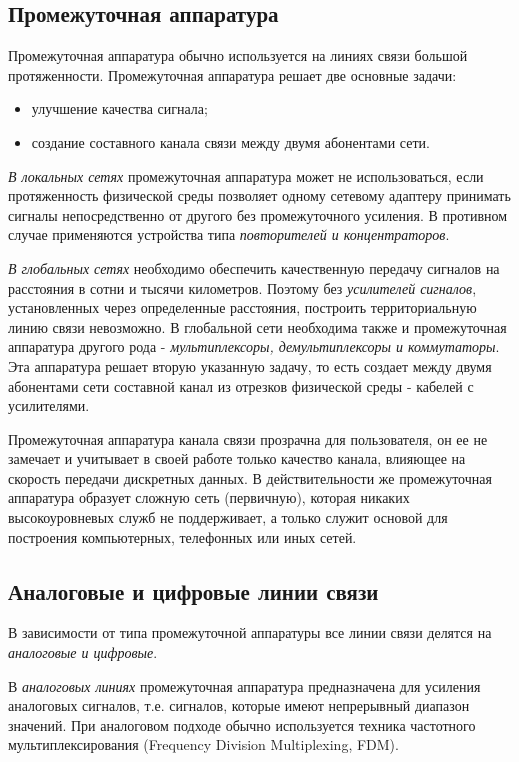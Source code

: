 \subsection{Промежуточная аппаратура}

Промежуточная аппаратура обычно используется на линиях связи большой протяженности.
Промежуточная аппаратура решает две основные задачи:
\begin{itemize}
    \item улучшение качества сигнала;
    \item создание составного канала связи между двумя абонентами сети.
\end{itemize}

\emph{В локальных сетях} промежуточная аппаратура может не использоваться, если протяженность физической среды позволяет одному сетевому адаптеру принимать сигналы непосредственно от другого без промежуточного усиления.
В противном случае применяются устройства типа \emph{повторителей и концентраторов}.

\emph{В глобальных сетях} необходимо обеспечить качественную передачу сигналов на расстояния в сотни и тысячи километров.
Поэтому без \emph{усилителей сигналов}, установленных через определенные расстояния, построить территориальную линию связи невозможно.
В глобальной сети необходима также и промежуточная аппаратура другого рода - \emph{мультиплексоры, демультиплексоры и коммутаторы}.
Эта аппаратура решает вторую указанную задачу, то есть создает между двумя абонентами сети составной канал из отрезков физической среды - кабелей с усилителями.

Промежуточная аппаратура канала связи прозрачна для пользователя, он ее не замечает и учитывает в своей работе только качество канала, влияющее на скорость передачи дискретных данных.
В действительности же промежуточная аппаратура образует сложную сеть (первичную), которая никаких высокоуровневых служб не поддерживает, а только служит основой для построения компьютерных, телефонных или иных сетей.

\subsection{Аналоговые и цифровые линии связи}

В зависимости от типа промежуточной аппаратуры все линии связи делятся на \emph{аналоговые и цифровые}.

В \emph{аналоговых линиях} промежуточная аппаратура предназначена для усиления аналоговых сигналов, т.е.
сигналов, которые имеют непрерывный диапазон значений.
При аналоговом подходе обычно используется техника частотного мультиплексирования (Frequency Division Multiplexing, FDM).

